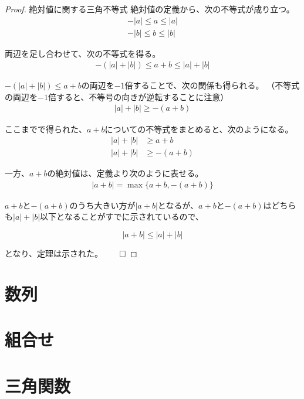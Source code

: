 \documentclass[../math-imaging]{subfiles}
\begin{document}
\begin{proof}{絶対値に関する三角不等式}
  絶対値の定義から、次の不等式が成り立つ。
  \begin{align}
    -|a| \leq a \leq |a| \\
    -|b| \leq b \leq |b|
  \end{align}

  両辺を足し合わせて、次の不等式を得る。
  \begin{align}
    -(|a| + |b|) \leq a + b \leq |a| + |b|
  \end{align}

  $-(|a| + |b|) \leq a + b$の両辺を$-1$倍することで、次の関係も得られる。
  （不等式の両辺を$-1$倍すると、不等号の向きが逆転することに注意）
  \begin{align}
    |a| + |b| \geq -(a + b)
  \end{align}

  ここまでで得られた、$a+b$についての不等式をまとめると、次のようになる。
  \begin{align}
    |a| + |b| & \geq a+b      \\
    |a| + |b| & \geq -(a + b)
  \end{align}

  一方、$a+b$の絶対値は、定義より次のように表せる。
  \begin{align}
    |a + b| = \max\{a + b, -(a + b)\}
  \end{align}

  $a+b$と$-(a+b)$のうち大きい方が$|a+b|$となるが、$a + b$と$-(a+b)$はどちらも$|a| + |b|$以下となることがすでに示されているので、

  \begin{equation}
    |a + b| \leq |a| + |b|
  \end{equation}

  となり、定理は示された。$\qed$
\end{proof}

\section{数列}

\wip

\section{組合せ}

\wip

\section{三角関数}
\end{document}
